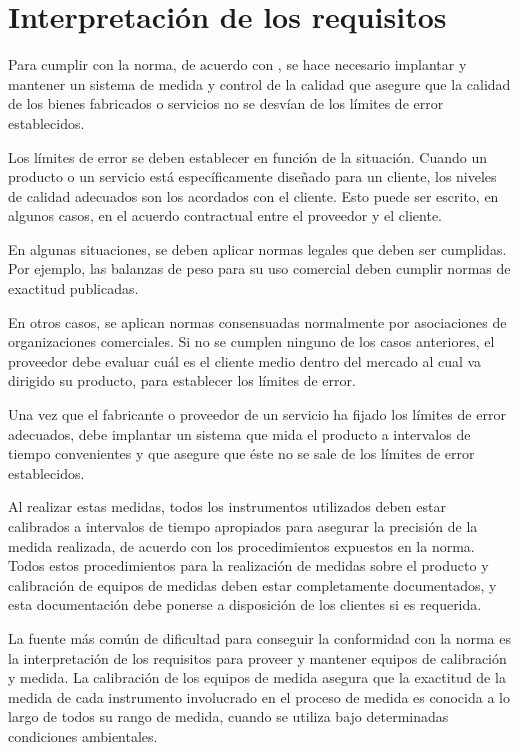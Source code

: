 
\section{Interpretación de los requisitos}

Para cumplir con la norma, de acuerdo con \citeauthor{morris1997measurement} \parencite*{morris1997measurement}, se hace necesario implantar y mantener un sistema de medida y control de la calidad que asegure que la calidad de los bienes fabricados o servicios no se desvían de los límites de error establecidos.

Los límites de error se deben establecer en función de la situación. Cuando un producto o un servicio está específicamente diseñado para un cliente, los niveles de calidad adecuados son los acordados con el cliente. Esto puede ser escrito, en algunos casos, en el acuerdo contractual entre el proveedor y el cliente.

En algunas situaciones, se deben aplicar normas legales que deben ser cumplidas. Por ejemplo, las balanzas de peso para su uso comercial deben cumplir normas de exactitud publicadas.

En otros casos, se aplican normas consensuadas normalmente por asociaciones de organizaciones comerciales. Si no se cumplen ninguno de los casos anteriores, el proveedor debe evaluar cuál es el cliente medio dentro del mercado al cual va dirigido su producto, para establecer los límites de error.

Una vez que el fabricante o proveedor de un servicio ha fijado los límites de error adecuados, debe implantar un sistema que mida el producto a intervalos de tiempo convenientes y que asegure que éste no se sale de los límites de error establecidos.

Al realizar estas medidas, todos los instrumentos utilizados deben estar calibrados a intervalos de tiempo apropiados para asegurar la precisión de la medida realizada, de acuerdo con los procedimientos expuestos en la norma. Todos estos procedimientos para la realización de medidas sobre el producto y calibración de equipos de medidas deben estar completamente documentados, y esta documentación debe ponerse a disposición de los clientes si es requerida.

La fuente más común de dificultad para conseguir la conformidad con la norma es la interpretación de los requisitos para proveer y mantener equipos de calibración y medida. La calibración de los equipos de medida asegura que la exactitud de la medida de cada instrumento involucrado en el proceso de medida es conocida a lo largo de todos su rango de medida, cuando se utiliza bajo determinadas condiciones ambientales.

